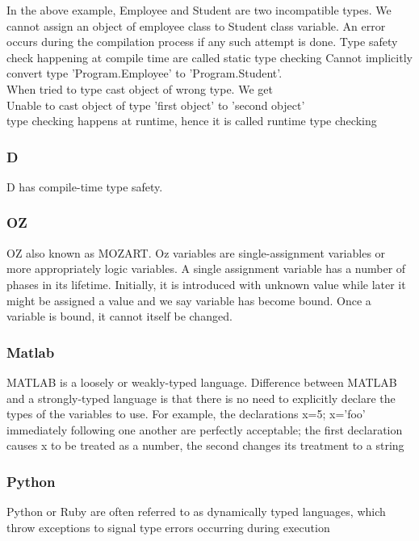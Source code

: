 \documentclass{sig-alternate}
\begin{document}
	In the above example, Employee and Student are two incompatible types. We cannot assign an object of employee class to Student class variable. An error occurs during the compilation process if any such attempt is done. Type safety check happening at compile time are called static type checking
	Cannot implicitly convert type 'Program.Employee' to 'Program.Student'. \\ When tried to type cast object of wrong type. We get \\
	Unable to cast object of type 'first object' to 'second object'\\
	type checking happens at runtime, hence it is called runtime type checking\\
	\subsubsection{D}
	D has compile-time type safety. 
	\subsubsection{OZ }
	OZ also known as MOZART. Oz variables are single-assignment variables or more appropriately logic variables. A single assignment variable has a number of phases in its lifetime. Initially, it is introduced with unknown value while later it might be assigned a value and we say variable has become bound. Once a variable is bound, it cannot itself be changed.
	\subsubsection{Matlab}
	MATLAB is a loosely or weakly-typed language. Difference between MATLAB and a strongly-typed language is that there is no need to explicitly declare the types of the variables to use. For example, the declarations x=5; x='foo' immediately following one another are perfectly acceptable; the first declaration causes x to be treated as a number, the second changes its treatment to a string
	\subsubsection{Python}
	Python or Ruby are often referred to as dynamically typed languages, which throw exceptions to signal type errors occurring during execution
\end{document}
